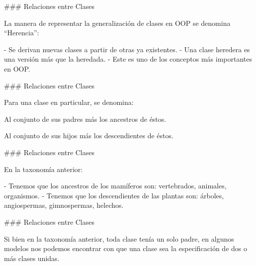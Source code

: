 ### Relaciones entre Clases

\newline

La manera de representar la generalización de clases en OOP se denomina ``Herencia'':

- Se derivan nuevas clases a partir de otras ya existentes.
- Una clase heredera es una versión más  que la heredada.
- Este es uno de los conceptos más importantes en OOP.


\centering{}

### Relaciones entre Clases

\newline

Para una clase en particular, se denomina:

\begin{description}[leftmargin=3em]
    \item[Ancestros:] Al conjunto de sus padres más los ancestros de éstos.
    \item[Descendientes:] Al conjunto de sus hijos más los descendientes de éstos.
\end{description}


### Relaciones entre Clases

\newline

En la taxonomía anterior:

\hspace{4em}\taxonomyOrg[0.5]

- Tenemos que los ancestros de los mamíferos son: {vertebrados, animales, organismos}.
- Tenemos que los descendientes de las plantas son: {árboles, angiospermas, gimnospermas, helechos}.

### Relaciones entre Clases

\newline

Si bien en la taxonomía anterior, toda clase tenía un solo padre, en algunos modelos nos podemos
encontrar con que una clase sea la especificación de dos o más clases unidas.\newline


